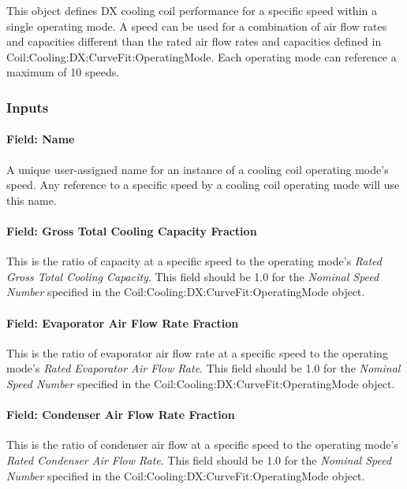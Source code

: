 This object defines DX cooling coil performance for a specific speed within a single operating mode. A speed can be used for a combination of air flow rates and capacities different than the rated air flow rates and capacities defined in Coil:Cooling:DX:CurveFit:OperatingMode. Each operating mode can reference a maximum of 10 speeds.

\subsubsection{Inputs}\label{inputs-04}

\paragraph{Field: Name}\label{field-name-04}

A unique user-assigned name for an instance of a cooling coil operating mode's speed. Any reference to a specific speed by a cooling coil operating mode will use this name.

\paragraph{Field: Gross Total Cooling Capacity Fraction}\label{field-gross-total-cooling-capacity-fraction}

This is the ratio of capacity at a specific speed to the operating mode's \textit{Rated Gross Total Cooling Capacity}. This field should be 1.0 for the \textit{Nominal Speed Number} specified in the Coil:Cooling:DX:CurveFit:OperatingMode object.

\paragraph{Field: Evaporator Air Flow Rate Fraction}\label{field-evaporator-air-flow-rate-fraction}

This is the ratio of evaporator air flow rate at a specific speed to the operating mode's \textit{Rated Evaporator Air Flow Rate}. This field should be 1.0 for the \textit{Nominal Speed Number} specified in the Coil:Cooling:DX:CurveFit:OperatingMode object.

\paragraph{Field: Condenser Air Flow Rate Fraction}\label{field-condenser-air-flow-rate-fraction}

This is the ratio of condenser air flow at a specific speed to the operating mode's \textit{Rated Condenser Air Flow Rate}. This field should be 1.0 for the \textit{Nominal Speed Number} specified in the Coil:Cooling:DX:CurveFit:OperatingMode object.

